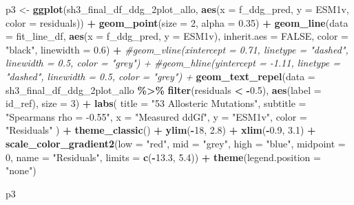 \documentclass[
]{article}
\newenvironment{Shaded}{\begin{snugshade}}{\end{snugshade}}
\newcommand{\AttributeTok}[1]{\textcolor[rgb]{0.13,0.29,0.53}{#1}}
\newcommand{\CommentTok}[1]{\textcolor[rgb]{0.56,0.35,0.01}{\textit{#1}}}
\newcommand{\ConstantTok}[1]{\textcolor[rgb]{0.56,0.35,0.01}{#1}}
\newcommand{\DecValTok}[1]{\textcolor[rgb]{0.00,0.00,0.81}{#1}}
\newcommand{\FloatTok}[1]{\textcolor[rgb]{0.00,0.00,0.81}{#1}}
\newcommand{\FunctionTok}[1]{\textcolor[rgb]{0.13,0.29,0.53}{\textbf{#1}}}
\newcommand{\NormalTok}[1]{#1}
\newcommand{\OtherTok}[1]{\textcolor[rgb]{0.56,0.35,0.01}{#1}}
\newcommand{\SpecialCharTok}[1]{\textcolor[rgb]{0.81,0.36,0.00}{\textbf{#1}}}
\newcommand{\StringTok}[1]{\textcolor[rgb]{0.31,0.60,0.02}{#1}}
\begin{document}
\begin{Shaded}
\begin{Highlighting}[]
\NormalTok{p3 }\OtherTok{\textless{}{-}} \FunctionTok{ggplot}\NormalTok{(sh3\_final\_df\_ddg\_2plot\_allo, }\FunctionTok{aes}\NormalTok{(}\AttributeTok{x =}\NormalTok{ f\_ddg\_pred, }\AttributeTok{y =}\NormalTok{ ESM1v, }\AttributeTok{color =}\NormalTok{ residuals)) }\SpecialCharTok{+}
  \FunctionTok{geom\_point}\NormalTok{(}\AttributeTok{size =} \DecValTok{2}\NormalTok{, }\AttributeTok{alpha =} \FloatTok{0.35}\NormalTok{) }\SpecialCharTok{+}
  \FunctionTok{geom\_line}\NormalTok{(}\AttributeTok{data =}\NormalTok{ fit\_line\_df, }\FunctionTok{aes}\NormalTok{(}\AttributeTok{x =}\NormalTok{ f\_ddg\_pred, }\AttributeTok{y =}\NormalTok{ ESM1v),}
            \AttributeTok{inherit.aes =} \ConstantTok{FALSE}\NormalTok{, }\AttributeTok{color =} \StringTok{"black"}\NormalTok{, }\AttributeTok{linewidth =} \FloatTok{0.6}\NormalTok{) }\SpecialCharTok{+}
  \CommentTok{\#geom\_vline(xintercept = 0.71, linetype = "dashed", linewidth = 0.5, color = "grey") +}
  \CommentTok{\#geom\_hline(yintercept = {-}1.11, linetype = "dashed", linewidth = 0.5, color = "grey") +}
  \FunctionTok{geom\_text\_repel}\NormalTok{(}\AttributeTok{data =}\NormalTok{ sh3\_final\_df\_ddg\_2plot\_allo }\SpecialCharTok{\%\textgreater{}\%} \FunctionTok{filter}\NormalTok{(residuals }\SpecialCharTok{\textless{}} \SpecialCharTok{{-}}\FloatTok{0.5}\NormalTok{),}
                  \FunctionTok{aes}\NormalTok{(}\AttributeTok{label =}\NormalTok{ id\_ref), }\AttributeTok{size =} \DecValTok{3}\NormalTok{) }\SpecialCharTok{+}
  \FunctionTok{labs}\NormalTok{(}
    \AttributeTok{title =} \StringTok{"53 Allosteric Mutations"}\NormalTok{,}
    \AttributeTok{subtitle =} \StringTok{"Spearman\textquotesingle{}s rho = {-}0.55"}\NormalTok{,}
    \AttributeTok{x =} \StringTok{"Measured ddGf"}\NormalTok{,}
    \AttributeTok{y =} \StringTok{"ESM1v"}\NormalTok{,}
    \AttributeTok{color =} \StringTok{"Residuals"}
\NormalTok{  ) }\SpecialCharTok{+}
  \FunctionTok{theme\_classic}\NormalTok{() }\SpecialCharTok{+}
  \FunctionTok{ylim}\NormalTok{(}\SpecialCharTok{{-}}\DecValTok{18}\NormalTok{, }\FloatTok{2.8}\NormalTok{) }\SpecialCharTok{+} \FunctionTok{xlim}\NormalTok{(}\SpecialCharTok{{-}}\FloatTok{0.9}\NormalTok{, }\FloatTok{3.1}\NormalTok{) }\SpecialCharTok{+}
  \FunctionTok{scale\_color\_gradient2}\NormalTok{(}\AttributeTok{low =} \StringTok{"red"}\NormalTok{, }\AttributeTok{mid =} \StringTok{"grey"}\NormalTok{, }\AttributeTok{high =} \StringTok{"blue"}\NormalTok{, }\AttributeTok{midpoint =} \DecValTok{0}\NormalTok{, }\AttributeTok{name =} \StringTok{"Residuals"}\NormalTok{,}
                       \AttributeTok{limits =} \FunctionTok{c}\NormalTok{(}\SpecialCharTok{{-}}\FloatTok{13.3}\NormalTok{, }\FloatTok{5.4}\NormalTok{)) }\SpecialCharTok{+}
  \FunctionTok{theme}\NormalTok{(}\AttributeTok{legend.position =} \StringTok{"none"}\NormalTok{)}


\NormalTok{p3}
\end{Highlighting}
\end{Shaded}
\end{document}
